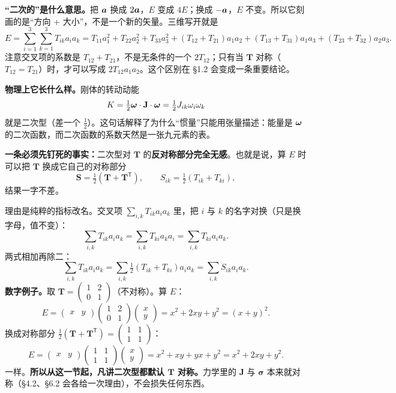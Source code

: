 \documentclass[11pt]{ctexart}
\newcommand{\ten}[1]{\mathbf{#1}}
\let\origsubhdr\subhdr
\renewcommand{\subhdr}[1]{\par\needspace{3\baselineskip}\origsubhdr{#1}}
\begin{document}
\textbf{“二次的”是什么意思。}把 $\boldsymbol{a}$ 换成 $2\boldsymbol{a}$，$E$ 变成 $4E$；换成 $-\boldsymbol{a}$，$E$ 不变。所以它刻画的是“方向 + 大小”，不是一个新的矢量。三维写开就是
\[
E=\sum_{i=1}^{3}\sum_{k=1}^{3}T_{ik}a_ia_k
=T_{11}a_1^2+T_{22}a_2^2+T_{33}a_3^2
+(T_{12}+T_{21})a_1a_2+(T_{13}+T_{31})a_1a_3+(T_{23}+T_{32})a_2a_3 .
\]
注意交叉项的系数是 $T_{12}+T_{21}$，不是无条件的一个 $2T_{12}$；只有当 $\ten T$ 对称（$T_{12}=T_{21}$）时，才可以写成 $2T_{12}a_1a_2$。这个区别在 §1.2 会变成一条重要结论。

\textbf{物理上它长什么样。}刚体的转动动能
\[
K=\tfrac12\vect\omega\cdot\ten J\cdot\vect\omega=\tfrac12J_{ik}\omega_i\omega_k
\]
就是二次型（差一个 $\tfrac12$）。这句话解释了为什么“惯量”只能用张量描述：能量是 $\boldsymbol{\omega}$ 的二次函数，而二次函数的系数天然是一张九元素的表。


\textbf{一条必须先钉死的事实：}二次型对 $\ten T$ 的\textbf{反对称部分完全无感}。也就是说，算 $E$ 时可以把 $\ten T$ 换成它自己的对称部分
\[
\ten S=\tfrac12(\ten T+\ten T^{\mathsf T}),\qquad S_{ik}=\tfrac12(T_{ik}+T_{ki}),
\]
结果一字不差。

理由是纯粹的指标改名。交叉项 $\sum_{i,k}T_{ik}a_ia_k$ 里，把 $i$ 与 $k$ 的名字对换（只是换字母，值不变）：
\[
\sum_{i,k}T_{ik}a_ia_k=\sum_{i,k}T_{ki}a_ka_i=\sum_{i,k}T_{ki}a_ia_k .
\]
两式相加再除二：
\[
\sum_{i,k}T_{ik}a_ia_k
=\sum_{i,k}\tfrac12(T_{ik}+T_{ki})a_ia_k
=\sum_{i,k}S_{ik}a_ia_k .
\]
\textbf{数字例子。}取 $\ten T=\begin{pmatrix}1&2\\0&1\end{pmatrix}$（不对称）。算 $E$：
\[
E=\begin{pmatrix}x&y\end{pmatrix}\begin{pmatrix}1&2\\0&1\end{pmatrix}\begin{pmatrix}x\\y\end{pmatrix}
=x^2+2xy+y^2=(x+y)^2 .
\]
换成对称部分 $\tfrac12(\ten T+\ten T^{\mathsf T})=\begin{pmatrix}1&1\\1&1\end{pmatrix}$：
\[
E=\begin{pmatrix}x&y\end{pmatrix}\begin{pmatrix}1&1\\1&1\end{pmatrix}\begin{pmatrix}x\\y\end{pmatrix}=x^2+xy+yx+y^2=x^2+2xy+y^2 .
\]
一样。\textbf{所以从这一节起，凡讲二次型都默认 $\ten T$ 对称。}力学里的 $\ten J$ 与 $\ten\sigma$ 本来就对称（§4.2、§6.2 会各给一次理由），不会损失任何东西。
\end{document}

